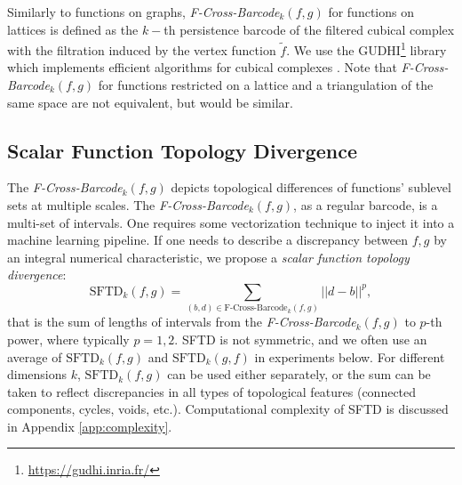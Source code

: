 \documentclass[runningheads]{llncs}
\begin{document}
Similarly to functions on graphs, \textit{F-Cross-Barcode}$_k(f, g)$ for functions on lattices is defined as the $k-$th persistence barcode of the filtered cubical complex with the filtration induced by the vertex function $\tilde{f}$. 
We use the GUDHI\footnote{\url{https://gudhi.inria.fr/}} library which implements efficient algorithms for cubical complexes \cite{wagner2011efficient}.
Note that \mbox{\textit{F-Cross-Barcode}$_k(f, g)$} for functions restricted on a lattice and a triangulation of the same space are not equivalent, but would be similar.




\subsection{Scalar Function Topology Divergence}

The \textit{F-Cross-Barcode}$_k(f, g)$ depicts topological differences of functions' sublevel sets at multiple scales. The \textit{F-Cross-Barcode}$_k(f, g)$, as a regular barcode, is a multi-set of intervals. One requires some vectorization technique to inject it into a machine learning pipeline. If one needs to describe a discrepancy between $f, g$ by an integral numerical characteristic, we propose a \textit{scalar function topology divergence}:
\begin{equation}
\label{eq:sftd}
\mbox{SFTD}_k(f, g) = \sum_{(b, d) \in \text{F-Cross-Barcode}_k(f, g)}{||d - b||^p},
\end{equation}
that is the sum of lengths of intervals from the \textit{F-Cross-Barcode}$_k(f, g)$ to $p$-th power, where typically $p=1,2$.
SFTD is not symmetric, and we often use an average of $\mbox{SFTD}_k(f, g)$ and $\mbox{SFTD}_k(g, f)$ in experiments below.
For different dimensions $k$, $\mbox{SFTD}_k(f, g)$ can be used either separately, or the sum can be taken to reflect discrepancies in all types of topological features (connected components, cycles, voids, etc.). Computational complexity of SFTD is discussed in Appendix \ref{app:complexity}. %
\end{document}
